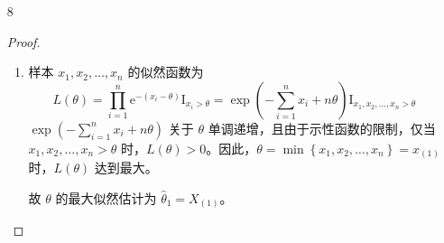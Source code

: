 \documentclass[normal,founder,mtpro2,cn]{elegantnote}
\begin{document}
\begin{enumerate}
\begin{proof}
\begin{enumerate}
                      又由于，$\hat{\theta}_{\text{MLE}}=\frac{1}{2}X_{(n)}$
                      \begin{gather*}
                          E\left(\hat{\theta}_{\text{MLE}}\right)=\frac{1}{2}E\left(X_{(n)}\right)=\frac{2n+1}{2(n+1)}\theta\neq\theta \\
                          \operatorname{Var}\left(\hat{\theta}_{\text{MLE}}\right)=\frac{1}{4}\operatorname{Var}\left(X_{(n)}\right)=\frac{n}{4(n+1)^{2}(n+2)}\theta^{2}
                      \end{gather*}
                      故 $\hat{\theta}_{\text{MLE}}=\frac{1}{2}X_{(n)}$ 不是参数 $\theta$ 的无偏估计。

                      因为，
                      \begin{gather*}
                          \lim_{n\rightarrow\infty}E\left(\hat{\theta}_{\text{MLE}}\right)=\lim_{n\rightarrow\infty}\frac{2n+1}{2(n+1)}\theta=\theta \\
                          \lim_{n\rightarrow\infty}\operatorname{Var}\left(\hat{\theta}_{\text{MLE}}\right)=\lim_{n\rightarrow\infty}\frac{n}{4(n+1)^{2}(n+2)}\theta^{2}=0
                      \end{gather*}
                      故 $\theta$ 的最大似然估计 $\hat{\theta}_{\text{MLE}}=\frac{1}{2}X_{(n)}$ 是参数 $\theta$ 的相合估计。
            \end{enumerate}
        \end{proof}
    \item[8]
        \begin{proof}
            \begin{enumerate}
                \item
                      样本 $x_{1},x_{2},\ldots,x_{n}$ 的似然函数为
                      \begin{equation*}
                          L(\theta)=\prod_{i=1}^{n}\mathrm{e}^{-\left(x_{i}-\theta\right)}\mathrm{I}_{x_{i}>\theta}=\exp\left(-\sum_{i=1}^{n}x_{i}+n\theta\right)\mathrm{I}_{x_{1},x_{2},\ldots,x_{n}>\theta}
                      \end{equation*}
                      $\exp\left(-\sum_{i=1}^{n}x_{i}+n\theta\right)$ 关于 $\theta$ 单调递增，且由于示性函数的限制，仅当 $x_{1},x_{2},\ldots,x_{n}>\theta$ 时，$L(\theta)>0$。因此，$\theta=\min\left\{x_{1},x_{2},\ldots,x_{n}\right\}=x_{(1)}$ 时，$L(\theta)$ 达到最大。

                      故 $\theta$ 的最大似然估计为 $\hat{\theta}_{1}=X_{(1)}$。


\end{enumerate}
\end{proof}
\end{enumerate}
\end{document}
